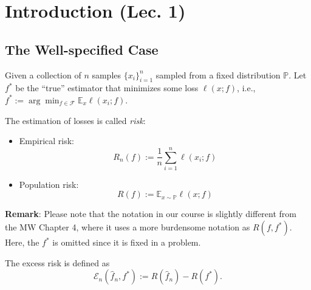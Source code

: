 \section{Introduction (Lec. 1)}
\subsection{The Well-specified Case}
Given a collection of $n$ samples $\{x_i\}_{i=1}^n$ sampled from a fixed distribution $\mathbb{P}$. Let $f^*$ be the ``true'' estimator that minimizes some loss $\ell(x; f)$, i.e., $f^* := \arg \min_{f\in\mathcal{F}} \mathbb{E}_x\ell(x_i; f)$. 

\begin{definition}[Risk] The estimation of losses is called \textit{risk}:
\begin{itemize}
\setlength\itemsep{-0.5em}
    \item Empirical risk: $$R_n(f) := \frac{1}{n} \sum_{i=1}^n \ell(x_i; f)$$
    \item Population risk: $$R(f) := \mathbb{E}_{x \sim \mathbb{P}} \ell(x; f)$$
\end{itemize}
\end{definition}
\textbf{Remark}: Please note that the notation in our course is slightly different from the MW Chapter 4, where it uses a more burdensome notation as $R(f, f^*)$. Here, the $f^*$ is omitted since it is fixed in a problem.
\begin{definition}
The excess risk is defined as $$\mathcal{E}_n(\hat{f}_n, f^*) := R(\hat{f}_n) - R(f^*).$$
\end{definition}

